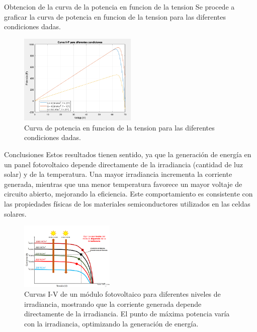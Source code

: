 \documentclass[
    10pt,
    aspectratio=169,
    xcolor={dvipsnames},
    spanish,
    ]{beamer}
\begin{document}
\begin{frame}
  \begin{block}{Obtencion de la curva de la potencia en funcion de la tension}
    Se procede a graficar la curva de potencia en funcion de la tension para las diferentes condiciones dadas.
    \begin{figure}
      \centering
      \includegraphics[width=0.5\textwidth]{Figure_7.png}
      \caption{Curva de potencia en funcion de la tension para las diferentes condiciones dadas.}
    \end{figure}
  \end{block}
\end{frame}
\begin{frame}
  \footnotesize
  \begin{block}{Conclusiones}
    Estos resultados tienen sentido, ya que la generación de energía en un panel fotovoltaico depende directamente de la irradiancia (cantidad de luz solar) y de la temperatura. Una mayor irradiancia incrementa la corriente generada, mientras que una menor temperatura favorece un mayor voltaje de circuito abierto, mejorando la eficiencia. Este comportamiento es consistente con las propiedades físicas de los materiales semiconductores utilizados en las celdas solares.
    \begin{figure}
      \centering
      \includegraphics[width=0.4\textwidth]{Figure_8.png}
      \caption{Curvas I-V de un módulo fotovoltaico para diferentes niveles de irradiancia, mostrando que la corriente generada depende directamente de la irradiancia. El punto de máxima potencia varía con la irradiancia, optimizando la generación de energía.}
    \end{figure}
  \end{block}  
\end{frame}
\end{document}
